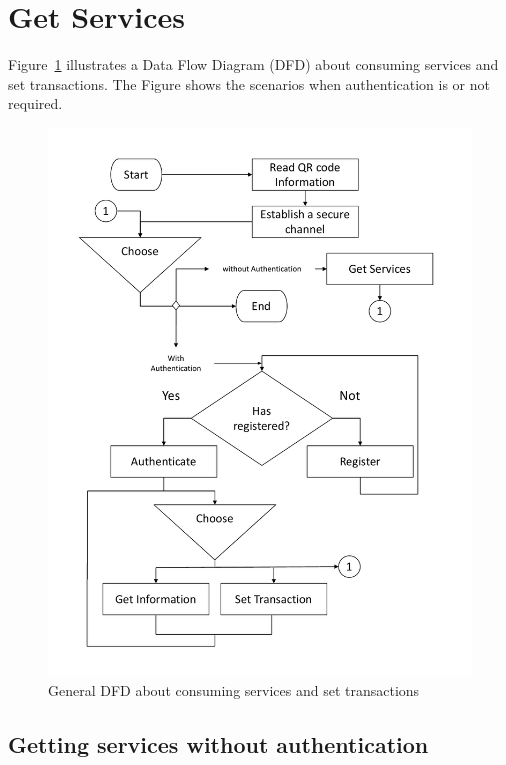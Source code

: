 \section{Get Services}
\label{sec:Services}
Figure~\ref{fig:dfdForAuthServices} illustrates a Data Flow Diagram (DFD) about consuming  
services and set transactions. The Figure shows the scenarios when authentication is or 
not required.


\begin{figure}[bt]
  \centering
    \includegraphics[scale=0.4]{images/dfd.pdf}
        \caption{General DFD about consuming services and set transactions}
    \label{fig:dfdForAuthServices}
\end{figure}

\subsection{Getting services without authentication}
\label{ssec:getServNoAuth}

